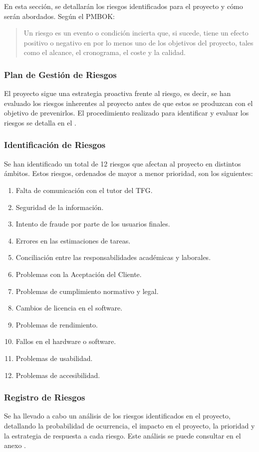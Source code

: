 En esta sección, se detallarán los riesgos identificados para el proyecto y cómo serán abordados. Según el PMBOK:
\begin{quote}
Un riesgo es un evento o condición incierta que, si sucede, tiene un efecto positivo o negativo en por lo menos uno de los objetivos del proyecto, tales como el alcance, el cronograma, el coste y la calidad. \cite{pmbok2013}
\end{quote}

\subsubsection{Plan de Gestión de Riesgos} 
El proyecto sigue una estrategia proactiva frente al riesgo, es decir, se han evaluado los riesgos inherentes al proyecto antes de que estos se produzcan con el objetivo de prevenirlos. El procedimiento realizado para identificar y evaluar los riesgos se detalla en el .


\subsubsection{Identificación de Riesgos}\label{Risks:identificacion_riesgos}
\hypertarget{Risks:identificacion_riesgos}{}
Se han identificado un total de 12 riesgos que afectan al proyecto en distintos ámbitos. Estos riesgos, ordenados de mayor a menor prioridad, son los siguientes:
\begin{enumerate}
    \item Falta de comunicación con el tutor del TFG.
    \item Seguridad de la información.
    \item Intento de fraude por parte de los usuarios finales.
    \item Errores en las estimaciones de tareas.
    \item Conciliación entre las responsabilidades académicas y laborales.
    \item Problemas con la Aceptación del Cliente.
    \item Problemas de cumplimiento normativo y legal.
    \item Cambios de licencia en el software.
    \item Problemas de rendimiento.
    \item Fallos en el hardware o software.
    \item Problemas de usabilidad.
    \item Problemas de accesibilidad.
\end{enumerate}

\subsubsection{Registro de Riesgos}
Se ha llevado a cabo un análisis de los riesgos identificados en el proyecto, detallando la probabilidad de ocurrencia, el impacto en el proyecto, la prioridad y la estrategia de respuesta a cada riesgo. Este análisis se puede consultar en el anexo .